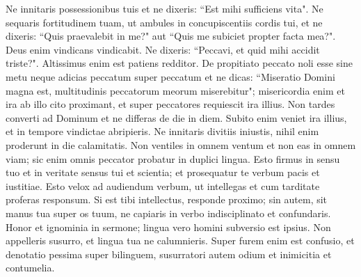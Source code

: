 \begin{biblechapter}  
\verse Ne innitaris possessionibus tuis et ne dixeris: “Est mihi sufficiens vita". 
\verse Ne sequaris fortitudinem tuam, ut ambules in concupiscentiis cordis tui, 
\verse et ne dixeris: “Quis praevalebit in me?" aut “Quis me subiciet propter facta mea?". Deus enim vindicans vindicabit. 
\verse Ne dixeris: “Peccavi, et quid mihi accidit triste?". Altissimus enim est patiens redditor. 
\verse De propitiato peccato noli esse sine metu neque adicias peccatum super peccatum 
\verse et ne dicas: “Miseratio Domini magna est, multitudinis peccatorum meorum miserebitur"; 
\verse misericordia enim et ira ab illo cito proximant, et super peccatores requiescit ira illius. 
\verse Non tardes converti ad Dominum et ne differas de die in diem. 
\verse Subito enim veniet ira illius, et in tempore vindictae abripieris. 
\verse Ne innitaris divitiis iniustis, nihil enim proderunt in die calamitatis. 
\verse Non ventiles in omnem ventum et non eas in omnem viam; sic enim omnis peccator probatur in duplici lingua. 
\verse Esto firmus in sensu tuo et in veritate sensus tui et scientia; et prosequatur te verbum pacis et iustitiae. 
\verse Esto velox ad audiendum verbum, ut intellegas et cum tarditate proferas responsum. 
\verse Si est tibi intellectus, responde proximo; sin autem, sit manus tua super os tuum, ne capiaris in verbo indisciplinato et confundaris. 
\verse Honor et ignominia in sermone; lingua vero homini subversio est ipsius. 
\verse Non appelleris susurro, et lingua tua ne calumnieris. 
\verse Super furem enim est confusio, et denotatio pessima super bilinguem, susurratori autem odium et inimicitia et contumelia. 
\end{biblechapter}

